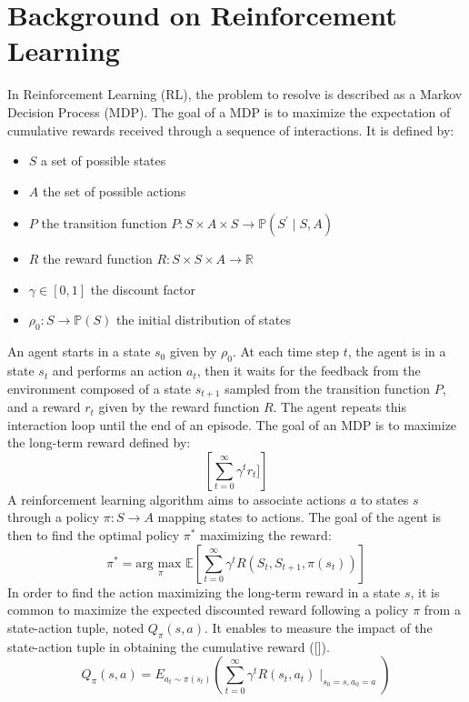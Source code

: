 \documentclass[conference]{IEEEtran}
\begin{document}
\section{Background on Reinforcement Learning} \label{sec:background}
In Reinforcement Learning (RL), the problem to resolve is described as a Markov Decision Process (MDP). The goal of a MDP is to maximize the expectation of cumulative rewards received through a sequence of interactions. It is defined by:
\begin{itemize}
\item $S$ a set of possible states
\item $A$ the set of possible actions
\item $P$ the transition function $P: S \times A \times S \to \mathbb{P}(S^{\prime}\mid{}S,A)$
\item $R$ the reward function $R: S \times S \times A \to \mathbb{R}$
\item $\gamma \in [0,1]$ the discount factor
\item $\rho_{0}: S \to \mathbb{P}(S)$ the initial distribution of states
\end{itemize}
An agent starts in a state $s_0$ given by $\rho_0$. At each time step $t$, the agent is in a state $s_t$ and performs an action $a_t$, then it waits for the feedback from the environment composed of a state $s_{t+1}$ sampled from the transition function $P$, and a reward $r_t$ given by the reward function $R$. The agent repeats this interaction loop until the end of an episode.
The goal of an MDP is to maximize the long-term reward defined by:
\begin{equation*}
    \left[\sum_{t=0}^{\infty} \gamma^{t}r_t]\right]
\end{equation*}
A reinforcement learning algorithm aims to associate actions $a$ to states $s$ through a policy $\pi: S \to A$ mapping states to actions. The goal of the agent is then to find the optimal policy $\pi^{\ast}$ maximizing the reward:
\begin{equation*}
    \pi^{\ast} = \underset{\pi}{\text{arg max }} \mathbb{E}\left[\sum_{t=0}^{\infty}\gamma^{t}R(S_t,S_{t+1},\pi(s_t))\right]
\end{equation*}
In order to find the action maximizing the long-term reward in a state $s$, it is common to maximize the expected discounted reward following a policy $\pi$ from a state-action tuple, noted $Q_{\pi}(s, a)$. It enables to measure the impact of the state-action tuple in obtaining the cumulative reward ([\cite{sutton2018reinforcement}]).
\begin{equation*}
    Q_{\pi}(s, a) = E_{a_{t}\sim\pi(s_t)}\left( \sum_{t=0}^{\infty}\gamma^{t}R(s_t,a_t)\mid_{s_0=s,a_0=a}\right)
\end{equation*}
\end{document}
